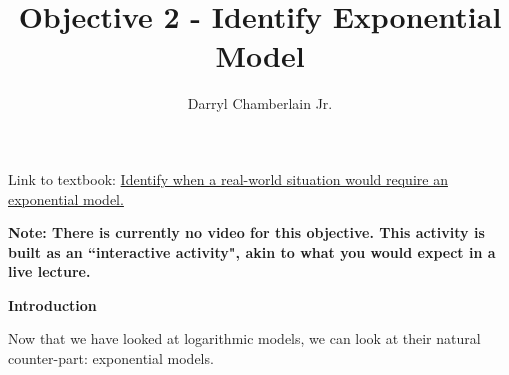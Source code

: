 \documentclass{ximera}
\author{Darryl Chamberlain Jr.}
\title{Objective 2 - Identify Exponential Model}
\begin{document}
\begin{abstract}

\end{abstract}

\maketitle
 
Link to textbook: 
\href{https://cnx.org/contents/mwjClAV_@8.21:_tqWoaDz@17/Exponential-and-Logarithmic-Models}{Identify when a real-world situation would require an exponential model.}

\textbf{Note: There is currently no video for this objective. This activity is built as an ``interactive activity", akin to what you would expect in a live lecture.}
 

\begin{center} \textbf{\Large Introduction} \end{center}

Now that we have looked at logarithmic models, we can look at their natural counter-part: exponential models. 
\end{document}
